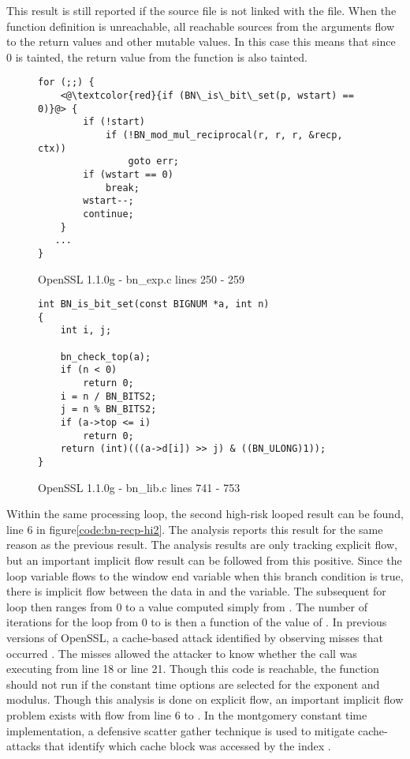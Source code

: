   This result is still reported if the  source file is not linked with
  the  file. When the function definition is unreachable, all reachable
  sources from the arguments flow to the return values and other mutable
  values. In this case this means that since  0 is tainted, the return value
  from the  function is also tainted.

\begin{figure}[h!]
\begin{lstlisting}
for (;;) {
    <@\textcolor{red}{if (BN\_is\_bit\_set(p, wstart) == 0)}@> {
        if (!start)
            if (!BN_mod_mul_reciprocal(r, r, r, &recp, ctx))
                goto err;
        if (wstart == 0)
            break;
        wstart--;
        continue;
    }
   ...
}
\end{lstlisting}
\caption{OpenSSL 1.1.0g - bn\_exp.c lines 250 - 259}
\label{code:bnexp-recp}
\end{figure}



\begin{figure}[h!]
\begin{lstlisting}
int BN_is_bit_set(const BIGNUM *a, int n)
{
    int i, j;

    bn_check_top(a);
    if (n < 0)
        return 0;
    i = n / BN_BITS2;
    j = n % BN_BITS2;
    if (a->top <= i)
        return 0;
    return (int)(((a->d[i]) >> j) & ((BN_ULONG)1));
}
\end{lstlisting}
\caption{OpenSSL 1.1.0g - bn\_lib.c lines 741 - 753}
\label{code:bn-isbitset}
\end{figure}

Within the same processing loop, the second high-risk looped result can be
found, line 6 in figure\ref{code:bn-recp-hi2}. The analysis reports this result
for the same reason as the previous result. The analysis results are only
tracking explicit flow, but an important implicit flow result can be followed
from this positive. Since the loop variable  flows to the window end
variable  when this branch condition is true, there is implicit
flow between the data in  and the  variable. The
subsequent for loop then ranges from 0 to  a value computed simply
from . The number of iterations for the loop from 0 to 
is then a function of the value of . In previous versions of OpenSSL,
a cache-based attack identified by observing misses that occurred
\cite{percival2005cache}. The misses allowed the attacker to know whether the
 call was executing from line 18 or line 21. Though this code is
reachable, the function should not run if the constant time options are selected
for the exponent and modulus. Though this analysis is done on explicit flow, an
important implicit flow problem exists with flow from line 6 to
. In the montgomery constant time implementation, a defensive
scatter gather technique is used to mitigate cache-attacks that identify which
cache block was accessed by the index 
\cite{cryptoeprint:2011:239,DBLP:journals/corr/DoychevK16}.


